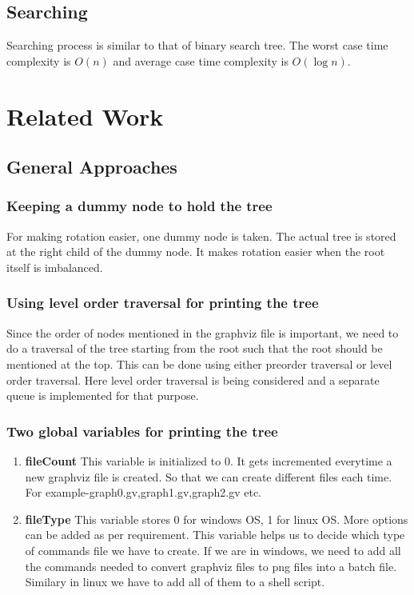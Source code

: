 \documentclass{article}
\begin{document}
\subsection{Searching}
\label{search}
Searching process is similar to that of binary search tree. The worst case time complexity is $O(n)$ and average case time complexity is $O(\log n)$.



\section{Related Work}
\subsection{General Approaches}
\subsubsection{Keeping a dummy node to hold the tree}
For making rotation easier, one dummy node is taken. The actual tree is stored at the right child of the dummy node. It makes rotation easier when the root itself is imbalanced.
\subsubsection{Using level order traversal for printing the tree}
Since the order of nodes mentioned in the graphviz file is important, we need to do a traversal of the tree starting from the root such that the root should be mentioned at the top. This can be done using either preorder traversal or level order traversal. Here level order traversal is being considered and a separate queue is implemented for that purpose.
\subsubsection{Two global variables for printing the tree}
\begin{enumerate}
	\item \textbf{fileCount}\newline
	This variable is initialized to 0. It gets incremented everytime a new graphviz file is created. So that we can create different files each time. For example-graph0.gv,graph1.gv,graph2.gv etc.
	\item \textbf{fileType}\newline
	This variable stores 0 for windows OS, 1 for linux OS. More options can be added as per requirement. This variable helps us to decide which type of commands file we have to create. If we are in windows, we need to add all the commands needed to convert graphviz files to png files into a batch file. Similary in linux we have to add all of them to a shell script.
\end{enumerate}
\end{document}
